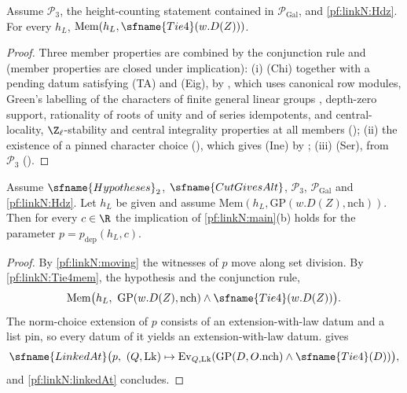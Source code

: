 \begin{theorem}\label{pf:linkN:Tie4mem}
Assume $\mathcal P_3$, the height-counting statement contained in $\mathcal P_{\mathrm{Gal}}$, and \cref{pf:linkN:Hdz}. For every
$h_L$, $\mathrm{Mem}(h_L,\sfname{Tie4}(w.D(Z)))$.
\end{theorem}

\begin{proof}
Three member properties are combined by the conjunction rule and 
(member properties are closed under implication):
(i) (Chi) together with a pending datum satisfying (TA) and (Eig), by ,
which uses canonical row modules, Green's labelling of the characters of finite general linear groups \cite{Green1955}, depth-zero
support, rationality of roots of unity and of series idempotents, and central-locality, $\Z_\ell$-stability and central integrality
properties at all members ();
(ii) the existence of a pinned character choice (), which
gives (Ine) by ;
(iii) (Ser), from $\mathcal P_3$ ().
\end{proof}

\begin{proposition}\label{pf:linkN:finalOfAlt}
Assume $\sfname{Hypotheses}_2$, $\sfname{CutGivesAlt}$, $\mathcal P_3$, $\mathcal P_{\mathrm{Gal}}$ and \cref{pf:linkN:Hdz}. Let $h_L$ be
given and assume $\mathrm{Mem}(h_L,\mathrm{GP}(w.D(Z),\mathrm{nch}))$. Then for every $c\in\R$ the implication of
\cref{pf:linkN:main}(b) holds for the parameter $p=p_{\mathrm{dep}}(h_L,c)$.
\end{proposition}

\begin{proof}
By \cref{pf:linkN:moving} the witnesses of $p$ move along set division. By \cref{pf:linkN:Tie4mem}, the hypothesis and the
conjunction rule,
\[
\mathrm{Mem}\bigl(h_L,\ \mathrm{GP}(w.D(Z),\mathrm{nch})\wedge\sfname{Tie4}(w.D(Z))\bigr).
\]
The norm-choice extension of $p$ consists of an extension-with-law datum and a list pin, so every datum of it yields an
extension-with-law datum.  gives
\[
\sfname{LinkedAt}\bigl(p,\ (Q,\mathrm{Lk})\mapsto\mathrm{Ev}_{Q,\mathrm{Lk}}(\mathrm{GP}(D,O.\mathrm{nch})\wedge\sfname{Tie4}(D))\bigr),
\]
and \cref{pf:linkN:linkedAt} concludes.
\end{proof}

